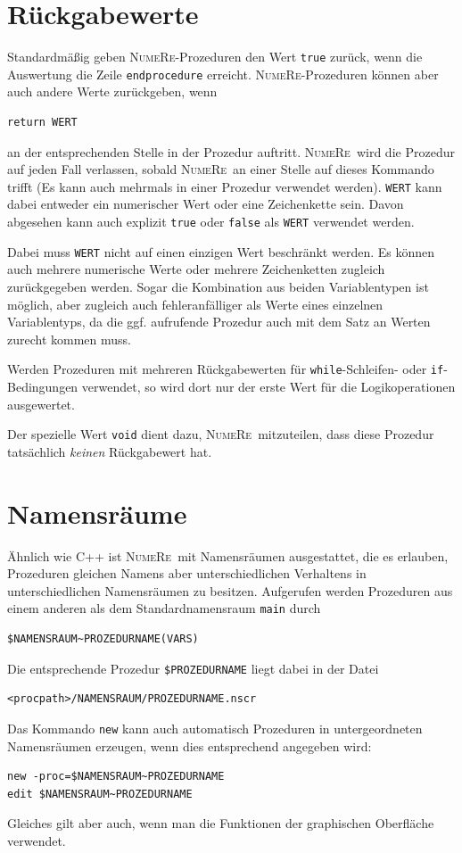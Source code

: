 \documentclass[DIV=14,headsepline,footsepline]{scrbook}
\newcommand{\NR}{\textsc{Nu\-me\-Re}}
\begin{document}
			\section{Rückgabewerte}
				Standardmäßig geben \NR-Prozeduren den Wert \lstinline+true+ zurück, wenn die Auswertung die Zeile \lstinline+endprocedure+ erreicht. \NR-Prozeduren können aber auch andere Werte zurückgeben, wenn
				\begin{lstlisting}
return WERT
				\end{lstlisting}
				an der entsprechenden Stelle in der Prozedur auftritt. \NR\ wird die Prozedur auf jeden Fall verlassen, sobald \NR\ an einer Stelle auf dieses Kommando trifft (Es kann auch mehrmals in einer Prozedur verwendet werden). \lstinline+WERT+ kann dabei entweder ein numerischer Wert oder eine Zeichenkette sein. Davon abgesehen kann auch explizit \lstinline+true+ oder \lstinline+false+ als \lstinline+WERT+ verwendet werden.
				
				Dabei muss \lstinline+WERT+ nicht auf einen einzigen Wert beschränkt werden. Es können auch mehrere numerische Werte oder mehrere Zeichenketten zugleich zurückgegeben werden. Sogar die Kombination aus beiden Variablentypen ist möglich, aber zugleich auch fehleranfälliger als Werte eines einzelnen Variablentyps, da die ggf. aufrufende Prozedur auch mit dem Satz an Werten zurecht kommen muss.
				
				Werden Prozeduren mit mehreren Rückgabewerten für \lstinline+while+-Schleifen- oder \lstinline+if+-Bedingungen verwendet, so wird dort nur der erste Wert für die Logikoperationen ausgewertet.
				
				Der spezielle Wert \lstinline+void+ dient dazu, \NR\ mitzuteilen, dass diese Prozedur tatsächlich \emph{keinen} Rückgabewert hat.
			\section{Namensräume}
				Ähnlich wie C++ ist \NR\ mit Namensräumen ausgestattet, die es erlauben, Prozeduren gleichen Namens aber unterschiedlichen Verhaltens in unterschiedlichen Namensräumen zu besitzen. Aufgerufen werden Prozeduren aus einem anderen als dem Standardnamensraum \lstinline+main+ durch 
				\begin{lstlisting}
$NAMENSRAUM~PROZEDURNAME(VARS)
				\end{lstlisting}
				Die entsprechende Prozedur \lstinline+$PROZEDURNAME+ liegt dabei in der Datei 
				\begin{lstlisting}
<procpath>/NAMENSRAUM/PROZEDURNAME.nscr
				\end{lstlisting}
				Das Kommando \lstinline+new+ kann auch automatisch Prozeduren in untergeordneten Namensräumen erzeugen, wenn dies entsprechend angegeben wird:
				\begin{lstlisting}
new -proc=$NAMENSRAUM~PROZEDURNAME
edit $NAMENSRAUM~PROZEDURNAME
				\end{lstlisting}
				Gleiches gilt aber auch, wenn man die Funktionen der graphischen Oberfläche verwendet.
				
\end{document}
